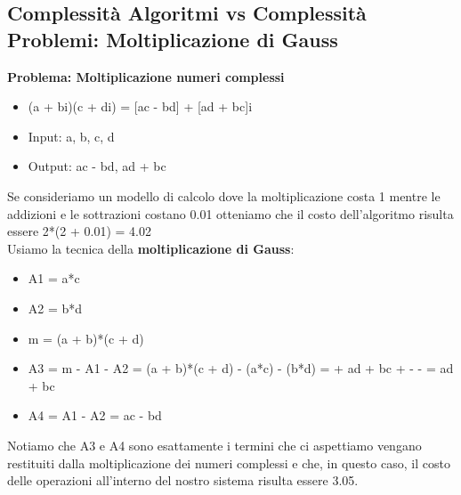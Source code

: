 \documentclass[../cheatSheetAlgoritmi.tex]{subfiles}
\begin{document}
\newpage

\subsection{Complessità Algoritmi vs Complessità Problemi: Moltiplicazione di Gauss}
\textbf{Problema: Moltiplicazione numeri complessi}
\begin{itemize}
	\item (a + bi)(c + di) = [ac - bd] + [ad + bc]i
	\item Input: a, b, c, d
	\item Output: ac - bd, ad + bc
\end{itemize}
Se consideriamo un modello di calcolo dove la moltiplicazione costa 1 mentre le addizioni e le sottrazioni costano 0.01 otteniamo che il costo dell'algoritmo risulta essere 2*(2 + 0.01) = 4.02\\
Usiamo la tecnica della \textbf{moltiplicazione di Gauss}:
\begin{itemize}
	\item A1 = a*c
	\item A2 = b*d
	\item m = (a + b)*(c + d)
	\item A3 = m - A1 - A2 = (a + b)*(c + d) - (a*c) - (b*d) =  + ad + bc +  -  - = ad + bc
	\item A4 = A1 - A2 = ac - bd
\end{itemize}
Notiamo che A3 e A4 sono esattamente i termini che ci aspettiamo vengano restituiti dalla moltiplicazione dei numeri complessi e che, in questo caso, il costo delle operazioni all'interno del nostro sistema risulta essere 3.05.
\end{document}
